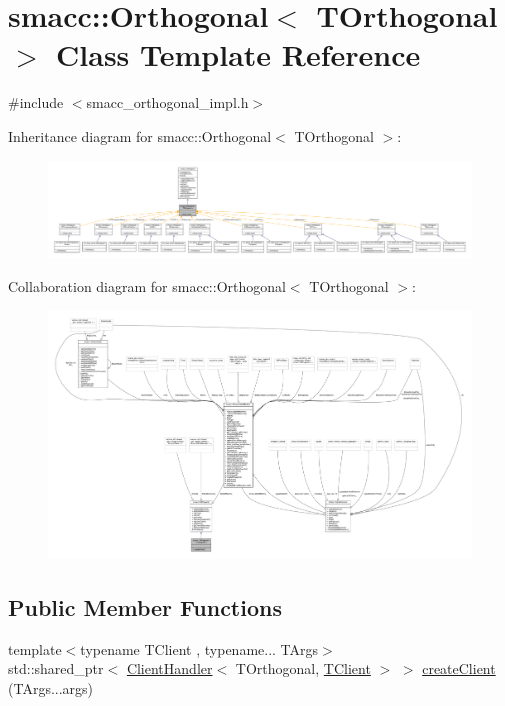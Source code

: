 \hypertarget{classsmacc_1_1Orthogonal}{}\section{smacc\+:\+:Orthogonal$<$ T\+Orthogonal $>$ Class Template Reference}
\label{classsmacc_1_1Orthogonal}


{\ttfamily \#include $<$smacc\+\_\+orthogonal\+\_\+impl.\+h$>$}



Inheritance diagram for smacc\+:\+:Orthogonal$<$ T\+Orthogonal $>$\+:\nopagebreak
\begin{figure}[H]
\begin{center}
\leavevmode
\includegraphics[width=350pt]{classsmacc_1_1Orthogonal__inherit__graph}
\end{center}
\end{figure}


Collaboration diagram for smacc\+:\+:Orthogonal$<$ T\+Orthogonal $>$\+:\nopagebreak
\begin{figure}[H]
\begin{center}
\leavevmode
\includegraphics[width=350pt]{classsmacc_1_1Orthogonal__coll__graph}
\end{center}
\end{figure}
\subsection*{Public Member Functions}
\begin{DoxyCompactItemize}
\item 
{\footnotesize template$<$typename T\+Client , typename... T\+Args$>$ }\\std\+::shared\+\_\+ptr$<$ \hyperlink{classsmacc_1_1ClientHandler}{Client\+Handler}$<$ T\+Orthogonal, \hyperlink{classTClient}{T\+Client} $>$ $>$ \hyperlink{classsmacc_1_1Orthogonal_af9e1b8d75e705c0f409d29acda08db5a}{create\+Client} (T\+Args...\+args)
\end{DoxyCompactItemize}
